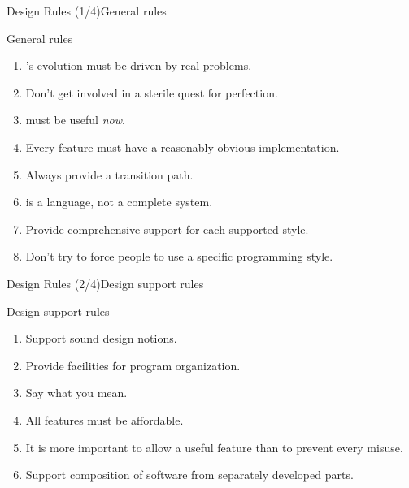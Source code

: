 \begin{frame}{Design Rules (1/4)}{General rules}
  \begin{block}{General rules}
    \begin{enumerate}
    \item
      \CCLang's evolution must be driven by real problems.
    \item
      Don't get involved in a sterile quest for perfection.
    \item
      \CCLang must be useful \emph{now}.
    \item
      Every feature must have a reasonably obvious implementation.
    \item
      Always provide a transition path.
    \item
      \CCLang is a language, not a complete system.
    \item
      Provide comprehensive support for each supported style.
    \item
      Don't try to force people to use a specific programming style.
    \end{enumerate}
  \end{block}
\end{frame}

\begin{frame}{Design Rules (2/4)}{Design support rules}
  \begin{block}{Design support rules}
    \begin{enumerate}
    \item
      Support sound design notions.
    \item
      Provide facilities for program organization.
    \item
      Say what you mean.
    \item
      All features must be affordable.
    \item
      It is more important to allow a useful feature than to prevent every misuse.
    \item
      Support composition of software from separately developed parts.
    \end{enumerate}
  \end{block}
\end{frame}


